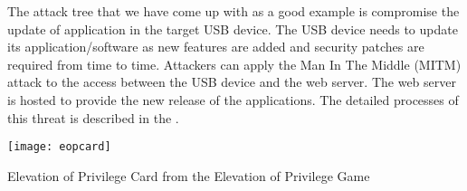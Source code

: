 The attack tree that we have come up with as a good example is compromise the
update of application in the target USB device. The USB device needs to update
its application/software as new features are added and security patches are
required from time to time. Attackers can apply the Man In The Middle (MITM)
attack to the access between the USB device and the web server. The web server
is hosted to provide the new release of the applications. The detailed processes
of this threat is described in the .

\begin{marginfigure}%
\centering
  \texttt{[image: eopcard]}
  \caption{Elevation of Privilege Card from the Elevation of Privilege Game}
  \label{fig:eopcard}
\end{marginfigure}
